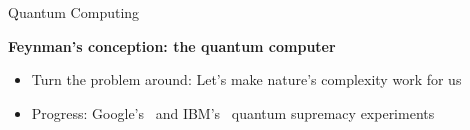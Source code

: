 \begin{refframe}{Quantum Computing}

	\begin{block}{\bf Feynman's conception: the quantum computer}
		\begin{itemize}
  		\item Turn the problem around: Let's make nature's complexity work for us
\pause
  		\item Progress: Google's~\cite{arute2019quantum} and IBM's~\cite{kim2023evidence} quantum supremacy experiments
		\end{itemize}
	\end{block}
	

	\centering


\end{refframe}








